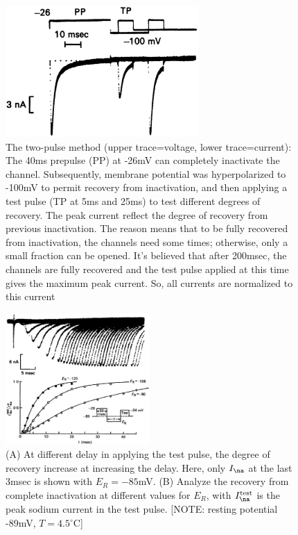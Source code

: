 \begin{figure}[hbt]
 \centerline{\includegraphics[height=5cm,
 angle=0]{./images/Ina_protocol_Chiu77.eps}}
 \caption{The two-pulse method (upper trace=voltage, lower trace=current): The
 40ms prepulse (PP) at -26mV can completely inactivate the channel.
 Subsequently, membrane potential was hyperpolarized to -100mV to permit
 recovery from inactivation, and then applying a test pulse (TP at 5ms and 25ms)
 to test different degrees of recovery. The peak current reflect the degree of
 recovery from previous inactivation. The reason means that to be fully
 recovered from inactivation, the channels need some times; otherwise, only a
 small fraction can be opened. It's believed that after 200msec, the channels
 are fully recovered and the test pulse applied at this time gives the maximum
 peak current. So, all currents are normalized to this current}
\label{fig:Ina_protocol_Chiu77}
\end{figure}

\begin{figure}[hbt]
 \centerline{\includegraphics[height=5cm,
 angle=0]{./images/Ina_peak_double-pulse-protocol.eps}}
 \caption{(A) At different delay in applying the test pulse, the degree of
 recovery increase at increasing the delay. Here, only $I_\na$ at the last 3msec
 is shown with $E_R=-85$mV. (B) Analyze the recovery from complete inactivation
 at different values for $E_R$, with $I_\na^{\text{test}}$ is the peak sodium current in the
 test pulse. [NOTE: resting potential -89mV, $T=4.5^\circ$C] }
\label{fig:Ina_recovery_Chiu77}
\end{figure}

